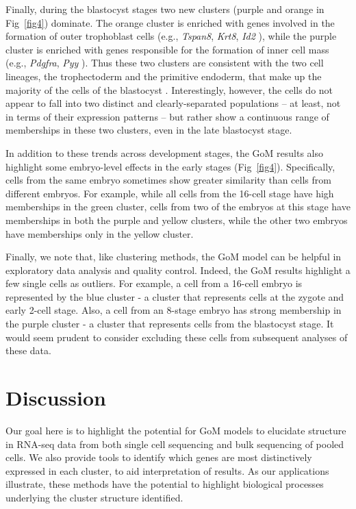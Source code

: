 \documentclass[10pt,letterpaper]{article}
\begin{document}
Finally, during the blastocyst stages two new clusters (purple and orange in Fig~\ref{fig4}) dominate. The orange cluster is enriched with genes involved in the formation of outer trophoblast cells (e.g., \textit{Tspan8}, \textit{Krt8}, \textit{Id2} \cite{Guo2010}), while the purple cluster is enriched with genes responsible for the formation of inner cell mass (e.g., \textit{Pdgfra}, \textit{Pyy} \cite{Hou2007}). Thus these two clusters are consistent with the two cell lineages, the trophectoderm and the primitive endoderm, that make up the majority of the cells of the blastocyst \cite{Rossant1995}. Interestingly, however, the cells do not appear to fall into two distinct and clearly-separated populations -- at least, not in terms of their expression patterns -- but rather show a continuous
range of memberships in these two clusters, even in the late blastocyst stage.

In addition to these trends across development stages, the GoM results also highlight some embryo-level effects in the early stages (Fig~\ref{fig4}). Specifically, cells from the same embryo sometimes show greater similarity than cells from different embryos.
For example, while all cells from the 16-cell stage have high memberships in the green cluster, cells from two of the embryos at this stage have memberships in both the purple and yellow clusters, while the other two embryos have memberships only in the yellow cluster.

Finally, we note that, like clustering methods, the GoM model can be helpful in exploratory data analysis and quality control. Indeed,
the GoM results highlight a few single cells as outliers. For example, a cell from a 16-cell embryo is represented by the blue cluster - a cluster that represents cells at the zygote and early 2-cell stage. Also, a cell from an 8-stage embryo has strong membership in the purple cluster - a cluster that represents cells from the blastocyst stage. It would seem prudent to consider excluding these cells from subsequent analyses of these data.




\section*{Discussion}

Our goal here is to highlight the potential for GoM models to elucidate
structure in RNA-seq data from both single cell sequencing and bulk sequencing of pooled cells.
We also provide tools to identify which genes
are most distinctively expressed in each cluster, to aid interpretation of results.
As our applications illustrate, these methods have the potential to highlight biological processes
underlying the cluster structure identified.
\end{document}
